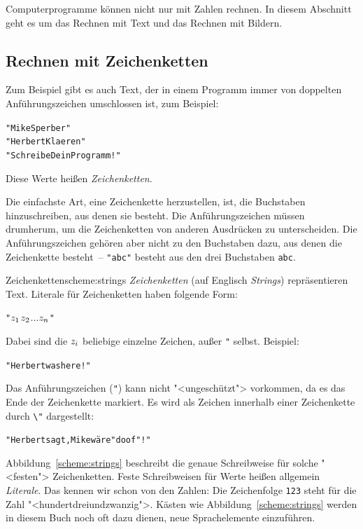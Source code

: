 Computerprogramme können nicht nur mit Zahlen rechnen.  In diesem
Abschnitt geht es um das Rechnen mit Text und das Rechnen mit Bildern.

\subsection{Rechnen mit Zeichenketten}

Zum Beispiel gibt es auch Text, der in einem Programm immer von
doppelten Anführungszeichen umschlossen ist, zum Beispiel:
%
\begin{alltt}
"Mike Sperber"
"Herbert Klaeren"
"Schreibe Dein Programm!"
\end{alltt}
%
Diese Werte heißen \textit{Zeichenketten}.

Die einfachste Art, eine Zeichenkette herzustellen, ist, die
Buchstaben hinzuschreiben, aus denen sie besteht.  Die
Anführungszeichen müssen drumherum, um die Zeichenketten von anderen
Ausdrücken zu unterscheiden.  Die Anführungszeichen gehören aber nicht
zu den Buchstaben dazu, aus denen die Zeichenkette besteht~--
\verb|"abc"| besteht aus den drei Buchstaben \texttt{abc}.

\begin{feature}{Zeichenketten}{scheme:strings}
\textit{Zeichenketten} (auf Englisch
\textit{Strings}) repräsentieren Text.
Literale für Zeichenketten haben folgende Form:
%
\begin{alltt}
"\(z\sb{1}\)\(z\sb{2}\) \(\ldots\) \(z\sb{n}\)"
\end{alltt}
%
Dabei sind die \(z\sb{i}\) beliebige einzelne Zeichen, außer \verb|"| selbst.
Beispiel:
%
\begin{alltt}
"Herbert was here!"
\end{alltt}
%
Das Anführungszeichen (\verb|"|) kann nicht "<ungeschützt"> vorkommen, da es das Ende der
Zeichenkette markiert. Es wird als Zeichen innerhalb einer Zeichenkette
durch \verb|\"| dargestellt:
%
\begin{alltt}
"Herbert sagt, Mike wäre \backwhack{}"doof\backwhack{}"!"
\end{alltt}
\end{feature}

Abbildung~\ref{scheme:strings} beschreibt die genaue Schreibweise für
solche "<festen"> Zeichenketten.  Feste Schreibweisen für Werte heißen
allgemein \textit{Literale}.  Das kennen wir schon von
den Zahlen: Die Zeichenfolge \texttt{123} steht für die Zahl
"<hundertdreiundzwanzig">.  Kästen wie Abbildung~\ref{scheme:strings}
werden in diesem Buch noch oft dazu dienen, neue Sprachelemente
einzuführen.

